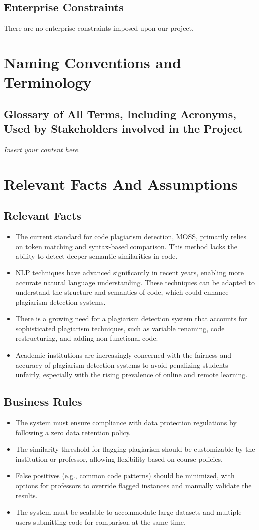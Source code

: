 \documentclass[12pt]{article}
\newcommand{\lips}{\textit{Insert your content here.}}
\begin{document}
\subsection{Enterprise Constraints}
There are no enterprise constraints imposed upon our project.

\section{Naming Conventions and Terminology}
\subsection{Glossary of All Terms, Including Acronyms, Used by Stakeholders
involved in the Project}
\lips

\section{Relevant Facts And Assumptions}
\subsection{Relevant Facts}
\begin{itemize}
  \item The current standard for code plagiarism detection, MOSS, primarily relies on token matching and syntax-based comparison. This method lacks the ability to detect deeper semantic similarities in code.
  \item NLP techniques have advanced significantly in recent years, enabling more accurate natural language understanding. These techniques can be adapted to understand the structure and semantics of code, which could enhance plagiarism detection systems.
  \item There is a growing need for a plagiarism detection system that accounts for sophisticated plagiarism techniques, such as variable renaming, code restructuring, and adding non-functional code.
  \item Academic institutions are increasingly concerned with the fairness and accuracy of plagiarism detection systems to avoid penalizing students unfairly, especially with the rising prevalence of online and remote learning.
\end{itemize}
\subsection{Business Rules}
\begin{itemize}
  \item The system must ensure compliance with data protection regulations by following a zero data retention policy.
  \item The similarity threshold for flagging plagiarism should be customizable by the institution or professor, allowing flexibility based on course policies.
  \item False positives (e.g., common code patterns) should be minimized, with options for professors to override flagged instances and manually validate the results.
  \item The system must be scalable to accommodate large datasets and multiple users submitting code for comparison at the same time.
\end{itemize}
\end{document}
